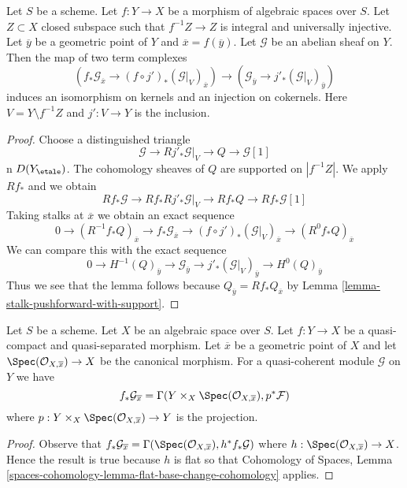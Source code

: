 \begin{lemma}
\label{lemma-stalk-formal-glueing}
Let $S$ be a scheme. Let $f : Y \to X$ be a morphism of algebraic spaces
over $S$. Let $Z \subset X$ closed subspace such that $f^{-1}Z \to Z$ is
integral and universally injective. Let $\overline{y}$ be a geometric point
of $Y$ and $\overline{x} = f(\overline{y})$. Let $\mathcal{G}$
be an abelian sheaf on $Y$. Then the map of two term complexes
$$
\left(f_*\mathcal{G}_{\overline{x}} \to
(f \circ j')_*(\mathcal{G}|_V)_{\overline{x}}\right)
\longrightarrow
\left(\mathcal{G}_{\overline{y}} \to j'_*(\mathcal{G}|_V)_{\overline{y}}\right)
$$
induces an isomorphism on kernels and an injection on cokernels.
Here $V = Y \setminus f^{-1}Z$ and $j' : V \to Y$ is the inclusion.
\end{lemma}

\begin{proof}
Choose a distinguished triangle
$$
\mathcal{G} \to Rj'_*\mathcal{G}|_V \to Q \to \mathcal{G}[1]
$$
n $D(Y_\etale)$. The cohomology sheaves of $Q$
are supported on $|f^{-1}Z|$. We apply $Rf_*$ and we obtain
$$
Rf_*\mathcal{G} \to Rf_*Rj'_*\mathcal{G}|_V \to Rf_*Q
\to Rf_*\mathcal{G}[1]
$$
Taking stalks at $\overline{x}$ we obtain an exact sequence
$$
0 \to
(R^{-1}f_*Q)_{\overline{x}} \to
f_*\mathcal{G}_{\overline{x}} \to
(f \circ j')_*(\mathcal{G}|_V)_{\overline{x}} \to
(R^0f_*Q)_{\overline{x}}
$$
We can compare this with the exact sequence
$$
0 \to
H^{-1}(Q)_{\overline{y}} \to
\mathcal{G}_{\overline{y}} \to
j'_*(\mathcal{G}|_V)_{\overline{y}} \to
H^0(Q)_{\overline{y}}
$$
Thus we see that the lemma follows because
$Q_{\overline{y}} = Rf_*Q_{\overline{x}}$ by
Lemma \ref{lemma-stalk-pushforward-with-support}.
\end{proof}

\begin{lemma}
\label{lemma-stalk-of-pushforward}
Let $S$ be a scheme. Let $X$ be an algebraic space over $S$.
Let $f : Y \to X$ be a quasi-compact and quasi-separated morphism.
Let $\overline{x}$ be a geometric point of $X$ and let
$\Spec(\mathcal{O}_{X, \overline{x}}) \to X$
be the canonical morphism. For a quasi-coherent module
$\mathcal{G}$ on $Y$ we have
$$
f_*\mathcal{G}_{\overline{x}} =
\Gamma(Y \times_X \Spec(\mathcal{O}_{X, \overline{x}}), p^*\mathcal{F})
$$
where $p : Y \times_X \Spec(\mathcal{O}_{X, \overline{x}}) \to Y$
is the projection.
\end{lemma}

\begin{proof}
Observe that $f_*\mathcal{G}_{\overline{x}} =
\Gamma(\Spec(\mathcal{O}_{X, \overline{x}}), h^*f_*\mathcal{G})$
where $h : \Spec(\mathcal{O}_{X, \overline{x}}) \to X$.
Hence the result is true because $h$ is flat so that
Cohomology of Spaces, Lemma
\ref{spaces-cohomology-lemma-flat-base-change-cohomology}
applies.
\end{proof}

